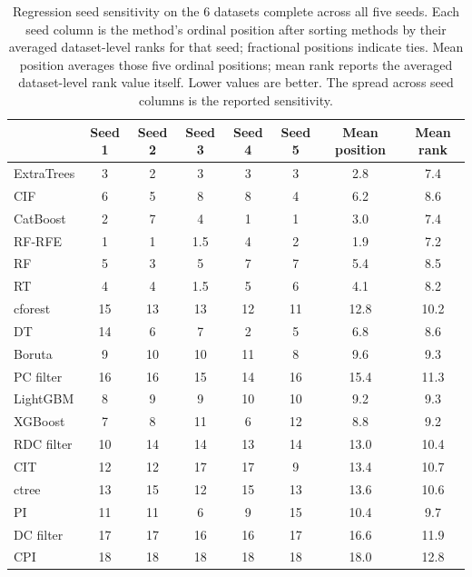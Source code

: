 \begin{table}[tb]
  \centering
  \footnotesize
  \setlength{\tabcolsep}{4pt}
  \renewcommand{\arraystretch}{1.04}
  \begin{tabular}{@{}l
    S[table-format=2.0]
    S[table-format=2.0]
    S[table-format=2.0]
    S[table-format=2.0]
    S[table-format=2.0]
    S[table-format=2.1]
    S[table-format=2.1]@{}}
    \toprule
     & {Seed 1} & {Seed 2} & {Seed 3} & {Seed 4} & {Seed 5} & {Mean position} & {Mean rank} \\
    \midrule
    ExtraTrees & 3 & 2 & 3 & 3 & 3 & 2.8 & 7.4 \\
    CIF & 6 & 5 & 8 & 8 & 4 & 6.2 & 8.6 \\
    CatBoost & 2 & 7 & 4 & 1 & 1 & 3.0 & 7.4 \\
    RF-RFE & 1 & 1 & 1.5 & 4 & 2 & 1.9 & 7.2 \\
    RF & 5 & 3 & 5 & 7 & 7 & 5.4 & 8.5 \\
    RT & 4 & 4 & 1.5 & 5 & 6 & 4.1 & 8.2 \\
    cforest & 15 & 13 & 13 & 12 & 11 & 12.8 & 10.2 \\
    DT & 14 & 6 & 7 & 2 & 5 & 6.8 & 8.6 \\
    Boruta & 9 & 10 & 10 & 11 & 8 & 9.6 & 9.3 \\
    PC filter & 16 & 16 & 15 & 14 & 16 & 15.4 & 11.3 \\
    LightGBM & 8 & 9 & 9 & 10 & 10 & 9.2 & 9.3 \\
    XGBoost & 7 & 8 & 11 & 6 & 12 & 8.8 & 9.2 \\
    RDC filter & 10 & 14 & 14 & 13 & 14 & 13.0 & 10.4 \\
    CIT & 12 & 12 & 17 & 17 & 9 & 13.4 & 10.7 \\
    ctree & 13 & 15 & 12 & 15 & 13 & 13.6 & 10.6 \\
    PI & 11 & 11 & 6 & 9 & 15 & 10.4 & 9.7 \\
    DC filter & 17 & 17 & 16 & 16 & 17 & 16.6 & 11.9 \\
    CPI & 18 & 18 & 18 & 18 & 18 & 18.0 & 12.8 \\
    \bottomrule
  \end{tabular}
  \caption{Regression seed sensitivity on the 6 datasets complete across all
  five seeds. Each seed column is the method's ordinal position after sorting
  methods by their averaged dataset-level ranks for that seed; fractional
  positions indicate ties. Mean position
  averages those five ordinal positions; mean rank reports the averaged
  dataset-level rank value itself. Lower values are better. The spread across seed columns is the reported sensitivity.}
  \label{tab:regression-seed-sensitivity}
\end{table}

